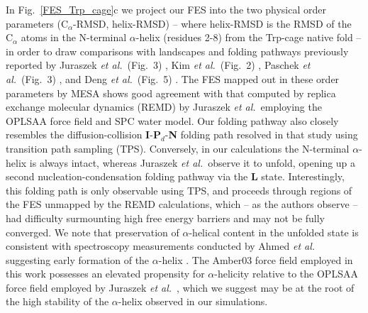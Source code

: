 \documentclass[12pt]{article}
\newcommand*{\blauw}[1]{#1}
\newcommand*{\groen}[1]{#1}
\begin{document}
In \blauw{Fig.~\ref{FES_Trp_cage}c} we project our FES into the two physical order parameters ($\mathrm{C}_\alpha$-RMSD, helix-RMSD) -- where helix-RMSD is the RMSD of the $\mathrm{C}_\alpha$ atoms in the N-terminal $\alpha$-helix (residues 2-8) from the Trp-cage native fold -- in order to draw comparisons with landscapes and folding pathways previously reported by Juraszek \textit{et al.}\ (Fig.\ 3) \cite{juraszek2006sampling}, Kim \textit{et al.}\ (Fig.\ 2) \cite{kim2015systematic}, Paschek \textit{et al.}\ (Fig.\ 3) \cite{paschek2008computing}, and Deng \textit{et al.}\ (Fig.\ 5) \cite{deng2013kinetics}. The FES mapped out in these order parameters by MESA shows good agreement with that computed by replica exchange molecular dynamics (\groen{REMD}) by Juraszek \textit{et al.}\ employing the OPLSAA force field \cite{kaminski2001evaluation} and SPC water model\cite{lindahl2001gromacs}. Our folding pathway also closely resembles the diffusion-collision \textbf{I}-\textbf{P}$_d$-\textbf{N} folding path resolved in that study using transition path sampling (\groen{TPS}). Conversely, in our calculations the N-terminal $\alpha$-helix is always intact, whereas Juraszek \textit{et al.}\ observe it to unfold, opening up a second nucleation-condensation folding pathway via the \textbf{L} state. Interestingly, this folding path is only observable using TPS, and proceeds through regions of the FES unmapped by the REMD calculations, which -- as the authors observe -- had difficulty surmounting high free energy barriers and may not be fully converged. We note that preservation of $\alpha$-helical content in the unfolded state is consistent with spectroscopy measurements conducted by Ahmed \textit{et al.}\ \cite{ahmed2005uv} suggesting early formation of the $\alpha$-helix \cite{juraszek2006sampling}. The Amber03 force field employed in this work possesses an elevated propensity for $\alpha$-helicity relative to the OPLSAA force field employed by Juraszek \textit{et al.}\ \cite{best2008current,juraszek2006sampling,paschek2008computing}, which we suggest may be at the root of the high stability of the $\alpha$-helix observed in our simulations.
\end{document}
